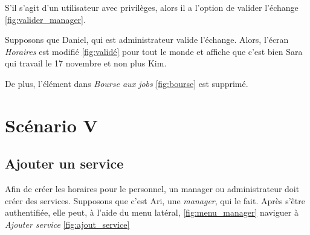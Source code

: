 S'il s'agit d'un utilisateur avec privilèges, alors il a l'option de valider l'échange \ref{fig:valider_manager}. 

Supposons que Daniel, qui est administrateur valide l'échange. Alors, l'écran \textit{Horaires} est modifié \ref{fig:validé}
pour tout le monde et affiche que c'est bien Sara qui travail le 17 novembre et non plus Kim. 

De plus, l'élément dans \textit{Bourse aux jobs} \ref{fig:bourse} est supprimé.
\newpage
\section[Ajouter un service - Scénario V]{Scénario V}
    \subsection*{Ajouter un service}
    Afin de créer les horaires pour le personnel, un manager ou administrateur doit créer des services. Supposons
    que c'est Ari, une \textit{manager}, qui le fait. Après s'être authentifiée, elle peut, à l'aide du menu latéral, \ref{fig:menu_manager} naviguer
    à \textit{Ajouter service} \ref{fig:ajout_service}

